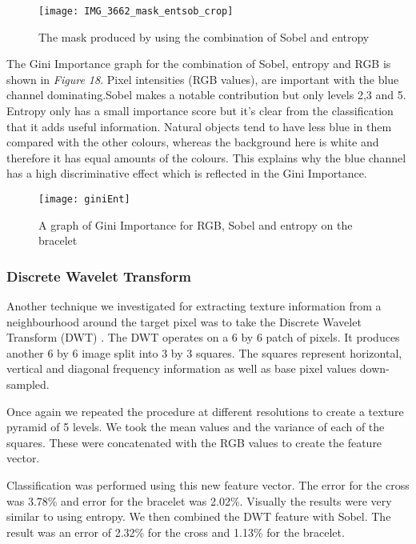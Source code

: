 \documentclass[12pt]{IIBproject}
\begin{document}
\begin{figure}[H]
  
  \centering
    \texttt{[image: IMG\_3662\_mask\_entsob\_crop]}
    \caption{The mask produced by using the combination of Sobel and entropy}
\end{figure}
The Gini Importance graph for the combination of Sobel, entropy and RGB is shown in \emph{Figure 18}. Pixel intensities (RGB values), are important with the blue channel dominating.Sobel makes a notable contribution but only levels 2,3 and 5. Entropy only has a small importance score but it's clear from the classification that it adds useful information. Natural objects tend to have less blue in them compared with the other colours, whereas the background here is white and therefore it has equal amounts of the colours. This explains why the blue channel has a high discriminative effect which is reflected in the Gini Importance. 

\begin{figure}[H]
  \caption{A graph of Gini Importance for RGB, Sobel and entropy on the bracelet}
  \centering
    \texttt{[image: giniEnt]}

\end{figure}

\subsubsection{Discrete Wavelet Transform}

Another technique we investigated for extracting texture information from a neighbourhood around the target pixel was to take the Discrete Wavelet Transform (DWT) \cite{shensa1992discrete}.  The DWT operates on a 6 by 6 patch of pixels. It produces another 6 by 6 image split into 3 by 3 squares. The squares represent horizontal, vertical and diagonal frequency information as well as base pixel values down-sampled. 

Once again we repeated the procedure at different resolutions to create a texture pyramid of 5 levels. We took the mean values and the variance of each of the squares. These were concatenated with the RGB values to create the feature vector. 

Classification was performed using this new feature vector. The error for the cross was 3.78\% and error for the bracelet was 2.02\%. Visually the results were very similar to using entropy. We then combined the DWT feature with Sobel. The result was an error of 2.32\% for the cross and 1.13\% for the bracelet. 
\newpage
\end{document}
